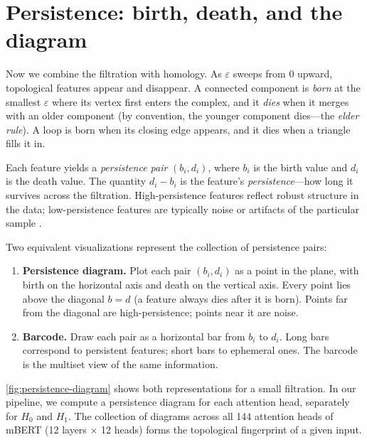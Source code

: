 \section{Persistence: birth, death, and the diagram}
\label{sec:persistence}

Now we combine the filtration with homology.
As $\varepsilon$ sweeps from $0$ upward, topological features appear and
disappear.
A connected component is \emph{born} at the smallest $\varepsilon$ where
its vertex first enters the complex, and it \emph{dies} when it merges
with an older component (by convention, the younger component dies---the
\emph{elder rule}).
A loop is born when its closing edge appears, and it dies when a
triangle fills it in.

Each feature yields a \emph{persistence pair} $(b_i, d_i)$, where $b_i$
is the birth value and $d_i$ is the death value.
The quantity $d_i - b_i$ is the feature's \emph{persistence}---how long
it survives across the filtration.
High-persistence features reflect robust structure in the data;
low-persistence features are typically noise or artifacts of the
particular sample \parencite{ghrist2008}.

Two equivalent visualizations represent the collection of persistence
pairs:

\begin{enumerate}
  \item \textbf{Persistence diagram.}
        Plot each pair $(b_i, d_i)$ as a point in the plane, with
        birth on the horizontal axis and death on the vertical axis.
        Every point lies above the diagonal $b = d$ (a feature always
        dies after it is born).
        Points far from the diagonal are high-persistence; points
        near it are noise.
  \item \textbf{Barcode.}
        Draw each pair as a horizontal bar from $b_i$ to $d_i$.
        Long bars correspond to persistent features; short bars to
        ephemeral ones.
        The barcode is the multiset view of the same information.
\end{enumerate}



\autoref{fig:persistence-diagram} shows both representations for a small
filtration.
In our pipeline, we compute a persistence diagram for each attention
head, separately for $H_0$ and $H_1$.
The collection of diagrams across all 144 attention heads of mBERT
(12 layers $\times$ 12 heads) forms the topological fingerprint of a
given input.


